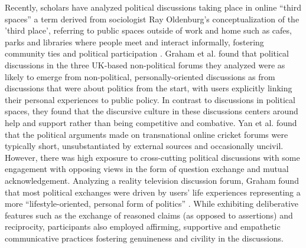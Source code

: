 \documentclass[letterpaper]{article} %
\begin{document}
Recently, scholars have analyzed political discussions taking place in online ``third spaces'' a term derived from sociologist Ray Oldenburg's conceptualization of the 'third place', referring to public spaces outside of work and home such as cafes, parks and libraries where people meet and interact informally, fostering community ties and political participation \cite{wright2012third,oldenburg2001celebrating}. Graham et al. \citeyearpar{graham2015everyday} found that political discussions in the three UK-based non-political forums they analyzed were as likely to emerge from non-political, personally-oriented discussions as from discussions that were about politics from the start, with users explicitly linking their personal experiences to public policy. In contrast to discussions in political spaces, they found that the discursive culture in these discussions centers around help and support rather than being competitive and combative. 
Yan et al. \citeyearpar{yan2018s} found that the political arguments made on transnational online cricket forums were typically short, unsubstantiated by external sources and occasionally uncivil. However, there was high exposure to cross-cutting political discussions with some engagement with opposing views in the form of question exchange and mutual acknowledgement. Analyzing a  reality television discussion forum, Graham found that most political exchanges were driven by users' life experiences representing a more ``lifestyle-oriented, personal form of politics'' \cite{graham2012beyond}. While exhibiting deliberative features such as the exchange of reasoned claims (as opposed to assertions) and reciprocity, participants also employed affirming, supportive and empathetic communicative practices fostering genuineness and civility in the discussions.
\end{document}
